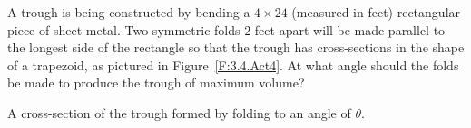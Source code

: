 

\begin{activity} \label{A:3.4.4}  
A trough is being constructed by bending a $4 \times 24$ (measured in feet) rectangular piece of sheet metal.  Two symmetric folds $2$ feet apart will be made parallel to the longest side of the rectangle so that the trough has cross-sections in the shape of a trapezoid, as pictured in Figure~\ref{F:3.4.Act4}.  At what angle should the folds be made to produce the trough of maximum volume?

\end{activity}

\begin{marginfigure}[-3cm]
\caption{A cross-section of the trough formed by folding to an angle of $\theta$.} \label{F:3.4.Act4}
\end{marginfigure}


